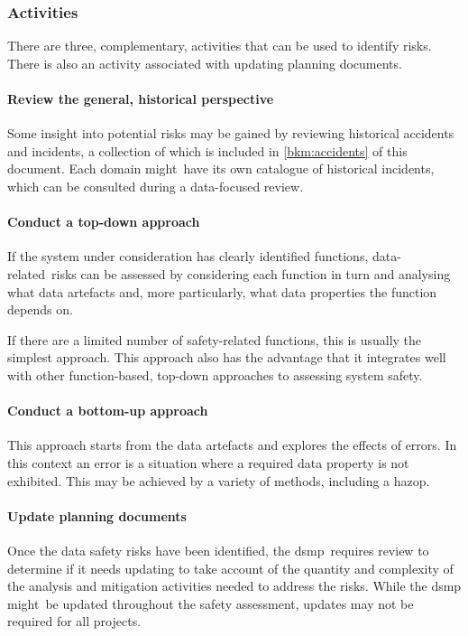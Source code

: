 \subsubsection{Activities}
There are three, complementary, activities that can be used to identify risks. There is also an activity associated with updating planning documents.

\paragraph{Review the general, historical perspective}
Some insight into potential risks may be gained by reviewing historical accidents and incidents, a collection of which is included in
\autoref{bkm:accidents} of this \cbstart document. Each domain might\cbend\ have its own catalogue of historical incidents, which can be consulted during a data-focused review.

\paragraph{Conduct a top-down approach}
If the system under consideration has clearly identified functions\cbstart, data-related\cbend\ risks can be assessed by considering each function in turn and analysing what \glspl{data artefact} and, more particularly, what data properties the function depends on.

If there are a limited number of safety-related functions, this is usually the simplest approach. This approach also has the advantage that it integrates well with other function-based, top-down approaches to assessing system safety. 

\paragraph{Conduct a bottom-up approach}
This approach starts from the \glspl{data artefact} and explores the effects of \glspl{error}. In this context an error is a situation where a required \gls{data property} is not exhibited. This may be achieved by a variety of methods, including a \gls{hazop}.

\paragraph{Update planning documents}
Once the data safety risks have been identified, the \cbstart\gls{dsmp}\cbend\ requires review to determine if it needs
updating to take account of the quantity and complexity of the analysis and mitigation activities needed to address the risks. While the \gls{dsmp} \cbstart might\cbend\ be updated throughout the \gls{safety assessment}, updates may not be required for all projects.

